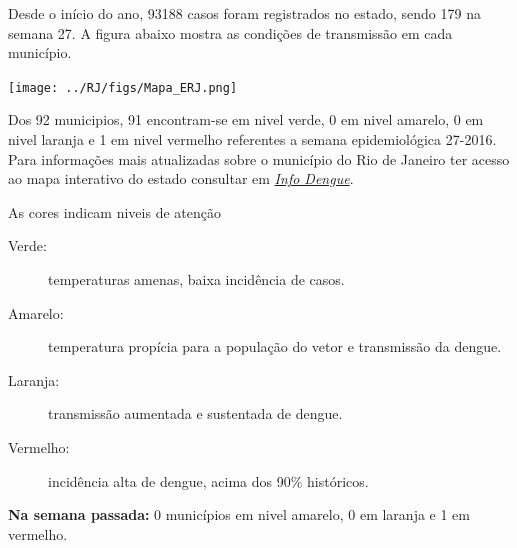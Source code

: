 \documentclass[10pt]{article} %
\begin{document}
\begin{minipage}[t]{.66\linewidth} %

\hypertarget{estado}{} %

Desde o início do ano, 93188 casos foram registrados no estado, sendo 179 na semana 27. A figura abaixo mostra as condições de transmissão em cada município.

\texttt{[image: ../RJ/figs/Mapa\_ERJ.png]}

Dos 92 municipios, 91 encontram-se em nivel verde, 0 em nivel amarelo, 0 em nivel laranja e 1 em nivel vermelho referentes a semana epidemiológica 27-2016. Para informações mais atualizadas
sobre o município do Rio de Janeiro ter acesso ao mapa interativo do estado consultar em \href{http://info.dengue.mat.br}{\textit{Info Dengue}}.


\vspace{1cm}
\begin{mdframed}[style=intextbox,frametitle={}] %

\hypertarget{descriptivebox}{} %
As cores indicam niveis de atenção
\begin{description}
\item[Verde:] temperaturas amenas, baixa incidência de casos.      
\item[Amarelo:] temperatura propícia para a população do vetor e transmissão da dengue.
\item[Laranja:] transmissão aumentada e sustentada de dengue. 
\item[Vermelho:] incidência alta de dengue, acima dos 90\% históricos.
\end{description}
\end{mdframed}

\textbf{Na semana passada:} 0 municípios em nivel amarelo, 0 em laranja e 1 em vermelho.  

\end{minipage} %
\end{document}
